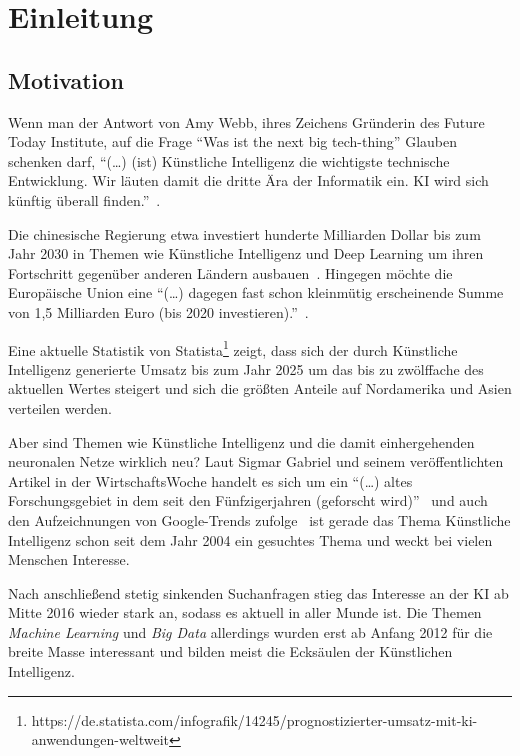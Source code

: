 \chapter{Einleitung}
\label{ch:einleitung}

\section{Motivation}
\label{sec:motivation}
Wenn man der Antwort von Amy Webb, ihres Zeichens Gründerin des Future Today Institute, auf die Frage \enquote{Was ist
the next big tech-thing} Glauben schenken darf, \enquote{(\ldots) (ist) Künstliche Intelligenz die wichtigste technische
Entwicklung. Wir läuten damit die dritte Ära der Informatik ein. KI wird sich künftig überall
finden.}~\cite{article_einleitung_dub_aw}.

Die chinesische Regierung etwa investiert hunderte Milliarden Dollar bis zum Jahr 2030 in Themen wie Künstliche
Intelligenz und Deep Learning um ihren Fortschritt gegenüber anderen Ländern ausbauen~\cite{article_einleitung_css}.
Hingegen möchte die Europäische Union eine \enquote{(\ldots) dagegen fast schon kleinmütig erscheinende Summe von 1,5
Milliarden Euro (bis 2020 investieren).}~\cite{article_einleitung_ww_sg}.

Eine aktuelle Statistik von
Statista\footnote{https://de.statista.com/infografik/14245/prognostizierter-umsatz-mit-ki-anwendungen-weltweit} zeigt,
dass sich der durch Künstliche Intelligenz generierte Umsatz bis zum Jahr 2025 um das bis zu zwölffache des aktuellen
Wertes steigert und sich die größten Anteile auf Nordamerika und Asien verteilen werden.

Aber sind Themen wie Künstliche Intelligenz und die damit einhergehenden neuronalen Netze wirklich neu? Laut Sigmar
Gabriel und seinem veröffentlichten Artikel in der WirtschaftsWoche handelt es sich um ein \enquote{(\ldots) altes
Forschungsgebiet in dem seit den Fünfzigerjahren (geforscht wird)}~\cite{article_einleitung_ww_sg} und auch den
Aufzeichnungen von Google-Trends zufolge~\cite{online_einleitung_googletrends} ist gerade das Thema Künstliche
Intelligenz schon seit dem Jahr 2004 ein gesuchtes Thema und weckt bei vielen Menschen Interesse.

Nach anschließend stetig sinkenden Suchanfragen stieg das Interesse an der KI ab Mitte 2016 wieder stark an, sodass es
aktuell in aller Munde ist. Die Themen \textit{Machine Learning} und \textit{Big Data} allerdings wurden erst ab Anfang
2012 für die breite Masse interessant und bilden meist die Ecksäulen der Künstlichen Intelligenz.

